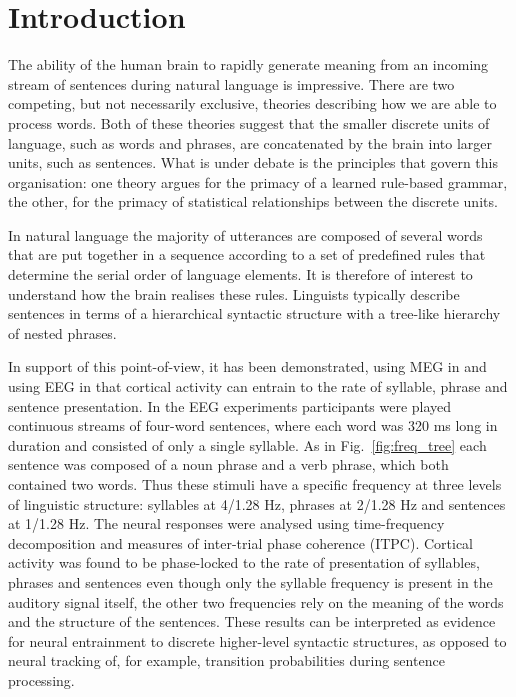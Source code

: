 \documentclass[a4paper,10pt,twoside]{article}
\begin{document}
\section{Introduction}



The ability of the human brain to rapidly generate meaning from an
incoming stream of sentences during natural language is
impressive. There are two competing, but not necessarily exclusive, theories describing how we are able to process words. Both
of these theories suggest that the smaller discrete units of language,
such as words and phrases, are concatenated by the brain into larger
units, such as sentences. What is under debate is the principles that
govern this organisation: one theory argues for the primacy of a
learned rule-based grammar, the other, for the primacy of statistical
relationships between the discrete units.

%
%

In natural language the majority of utterances are composed of several
words that are put together in a sequence according to a set of
predefined rules that determine the serial order of language
elements. It is therefore of interest to understand how the brain
realises these rules. Linguists typically describe sentences in terms
of a hierarchical syntactic structure with a tree-like hierarchy of
nested phrases.

In support of this point-of-view, it has been demonstrated, using MEG
in \cite{DingEtAl2016} and using EEG in \cite{DingEtAl2017} that
cortical activity can entrain to the rate of syllable, phrase and
sentence presentation. In the EEG experiments participants were played
continuous streams of four-word sentences, where each word was 320 ms
long in duration and consisted of only a single syllable. As in
Fig.~\ref{fig:freq_tree} each sentence was composed of a noun phrase
and a verb phrase, which both contained two words. Thus these stimuli
have a specific frequency at three levels of linguistic structure:
syllables at 4/1.28 Hz, phrases at 2/1.28 Hz and sentences at 1/1.28
Hz. The neural responses were analysed using time-frequency
decomposition and measures of inter-trial phase coherence
(ITPC). Cortical activity was found to be phase-locked to the rate of
presentation of syllables, phrases and sentences even though only the
syllable frequency is present in the auditory signal itself, the other two
frequencies rely on the meaning of the words and the structure of the
sentences. These results can be interpreted as evidence for neural
entrainment to discrete higher-level syntactic structures, as opposed
to neural tracking of, for example, transition probabilities during
sentence processing.
\end{document}
